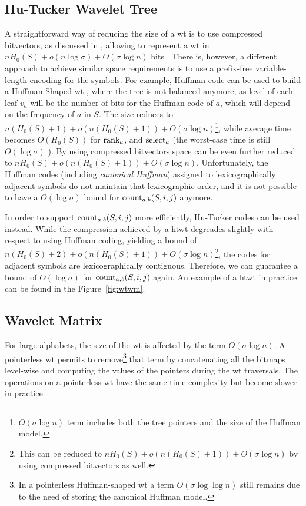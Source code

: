 \documentclass[a4paper,10pt,twoside]{book}
\begin{document}
    \subsection{Hu-Tucker Wavelet Tree}
    A straightforward way of reducing the size of a \gls{wt} is to use compressed bitvectors, as discussed in \cite{CNspire08.1}, allowing to represent a \gls{wt} in $nH_0(S) + o(n\log\sigma) + O(\sigma\log n)$ bits \cite{WT03}. There is, however, a different approach to achieve similar space requirements is to use a prefix-free variable-length encoding for the symbols.
    For example, Huffman code \cite{huffman1952method} can be used to build a
    Huffman-Shaped \gls{wt} \cite{ferragina2009compressed}, where the tree is not balanced
    anymore, as level of each leaf $v_a$ will be the number of bits for the Huffman code of $a$, which will depend on the frequency of $a$ in $S$. The size reduces to $n(H_0(S)+1)+ o(n(H_0(S)+1)) +  O(\sigma \log n)$\footnote{$O(\sigma \log n)$ term 
    includes both the tree pointers and the size of the Huffman model.}, while average time becomes
    $O(H_0(S))$ for $\operatorname{rank}_a$, and $\operatorname{select}_a$  (the worst-case time is still $O(\log\sigma)$ 
    \cite{Barbay:2013:CPA:2562345.2562626}). By using compressed
    bitvectors \cite{CNspire08.1} space can be even further reduced to $nH_0(S) + o(n(H_0(S)+1)) +  O(\sigma \log n)$.
    Unfortunately, the Huffman codes (including \textit{canonical Huffman}) assigned to
    lexicographically adjacent symbols do not maintain that lexicographic order, and it is not possible to have a $O(\log\sigma)$ bound for $\operatorname{count}_{a,b}(S,i,j)$ anymore.
	
	In order to support $\operatorname{count}_{a,b}(S,i,j)$ more efficiently, Hu-Tucker codes \cite{hu1971optimal} can be used instead. While the compression achieved by a \gls{htwt} \cite{barbay2009compressed} degreades slightly with respect to using Huffman coding, yielding a bound of $n(H_0(S)+2) + o(n(H_0(S)+1)) +  O(\sigma \log n)$\footnote{This can be reduced to  $nH_0(S) + o(n(H_0(S)+1)) +  O(\sigma \log n)$ by using compressed bitvectors as well.}, the codes for adjacent symbols are lexicographically contiguous. Therefore, we can guarantee a bound of $O(\log\sigma)$ for $\operatorname{count}_{a,b}(S,i,j)$ again. An example of a \gls{htwt} in practice can be found in the Figure~\ref{fig:wtwm}.
	
	\subsection{Wavelet Matrix}
	For large alphabets, the size of the \gls{wt} is affected by the term $ O(\sigma \log n)$. A {pointerless}
    \gls{wt} \cite{CNspire08.1} permits to remove\footnote{In a pointerless Huffman-shaped \gls{wt}  a
    term $O(\sigma \log\log n)$ still remains due to the need of storing the canonical Huffman model.} 
    that term by concatenating all the bitmaps level-wise 
    and computing the values of the pointers during the \gls{wt} traversals. 
    The operations on a pointerless \gls{wt} have the same time complexity but become slower in practice. 
    
\end{document}

